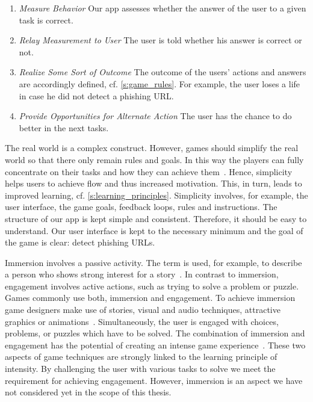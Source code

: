 \begin{description}[leftmargin=0cm]
\begin{enumerate}
	\item \textit{Measure Behavior} Our app assesses whether the answer of the user to a given task is correct.
	\item \textit{Relay Measurement to User} The user is told whether his answer is correct or not.
	\item \textit{Realize Some Sort of Outcome} The outcome of the users' actions and answers are accordingly defined, cf. \autoref{s:game_rules}. 
For example, the user loses a life in case he did not detect a phishing URL.
	\item \textit{Provide Opportunities for Alternate Action} 
The user has the chance to do better in the next tasks.
\end{enumerate}
	\item[Simplicity] The real world is a complex construct.
However, games should simplify the real world so that there only remain rules and goals.
In this way the players can fully concentrate on their tasks and how they can achieve them~\cite{csikszentmihalyi1997finding}.
Hence, simplicity helps users to achieve flow and thus increased motivation. 
This, in turn, leads to improved learning, cf. \autoref{s:learning_principles}.
Simplicity involves, for example, the user interface, the game goals, feedback loops, rules and instructions.
The structure of our app is kept simple and consistent.
Therefore, it should be easy to understand.
Our user interface is kept to the necessary minimum and the goal of the game is clear: detect phishing URLs.
	\item[Immersion and Engagement] Immersion involves a passive activity. 
The term is used, for example, to describe a person who shows strong interest for a story~\cite{mcmahan2003immersion}. 
In contrast to immersion, engagement involves active actions, such as trying to solve a problem or puzzle.
Games commonly use both, immersion and engagement.
To achieve immersion game designers make use of stories, visual and audio techniques, attractive graphics or animations~\cite{schell2008art}.
Simultaneously, the user is engaged with choices, problems, or puzzles which have to be solved.
The combination of immersion and engagement has the potential of creating an intense game experience~\cite{murphy2011games}.
These two aspects of game techniques are strongly linked to the learning principle of intensity.
By challenging the user with various tasks to solve we meet the requirement for achieving engagement. 
However, immersion is an aspect we have not considered yet in the scope of this thesis.

\end{description}
